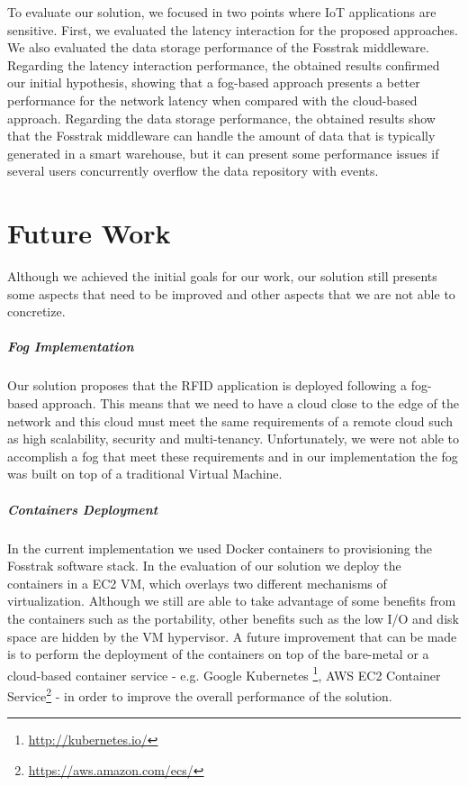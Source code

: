 To evaluate our solution, we focused in two points where \gls{IoT} applications are sensitive. First,
we evaluated the latency interaction for the proposed approaches. We also evaluated the data storage
performance of the Fosstrak middleware. Regarding the latency interaction performance, the obtained
results confirmed our initial hypothesis, showing that a fog-based approach presents a better
performance for the network latency when compared with the cloud-based approach. Regarding the data
storage performance, the obtained results show that the Fosstrak middleware can handle the amount
of data that is typically generated in a smart warehouse, but it can present some performance issues
if several users concurrently overflow the data repository with events.

\section{Future Work}
\label{sec:future_work}
Although we achieved the initial goals for our work, our solution still presents some aspects that
need to be improved and other aspects that we are not able to concretize.

\subparagraph{Fog Implementation}
\label{subp:fog_impl}
Our solution proposes that the \gls{RFID} application is deployed following a fog-based approach.
This means that we need to have a cloud close to the edge of the network and this cloud must meet
the same requirements of a remote cloud such as high scalability, security and multi-tenancy.
Unfortunately, we were not able to accomplish a fog that meet these requirements and in our implementation
the fog was built on top of a traditional Virtual Machine.\\

\subparagraph{Containers Deployment}
\label{subp:containers_impl}
In the current implementation we used Docker containers to provisioning the Fosstrak software stack.
In the evaluation of our solution we deploy the containers in a \gls{EC2} \gls{VM}, which overlays two
different mechanisms of virtualization. Although we still are able to take advantage of some benefits
from the containers such as the portability, other benefits such as the low I/O and disk space are
hidden by the \gls{VM} hypervisor. A future improvement that can be made is to perform the deployment
of the containers on top of the bare-metal or a cloud-based container service - e.g. Google Kubernetes
\footnote{\url{http://kubernetes.io/}}, \gls{AWS} \gls{EC2} Container Service\footnote{\url{https://aws.amazon.com/ecs/}} -
in order to improve the overall performance of the solution.

